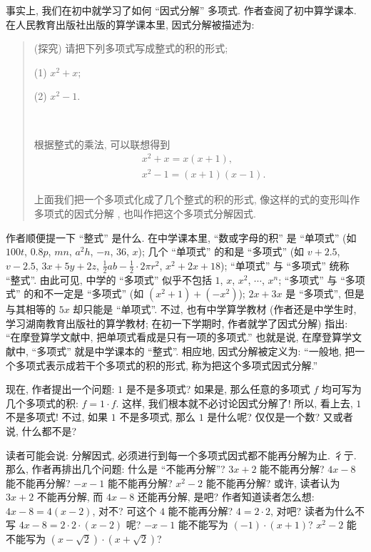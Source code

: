 \begin{example}
    事实上, 我们在初中就学习了如何 ``因式分解'' 多项式. 作者查阅了初中算学课本. 在人民教育出版社出版的算学课本里, 因式分解被描述为:
    \begin{quotation}
        (探究) 请把下列多项式写成整式的积的形式;

        (1) $x^2 + x$;

        (2) $x^2 - 1$.

        ~\

        根据整式的乘法, 可以联想得到
        \begin{align*}
             & x^2 + x = x(x+1),         \\
             & x^2 - 1 = (x + 1)(x - 1).
        \end{align*}

        上面我们把一个多项式化成了几个整式的积的形式, 像这样的式的变形叫作多项式的因式分解 , 也叫作把这个多项式分解因式.
    \end{quotation}

    作者顺便提一下 ``整式'' 是什么. 在中学课本里, ``数或字母的积'' 是 ``单项式'' (如 $100t$, $0.8p$, $mn$, $a^2 h$, $-n$, $36$, $x$); 几个 ``单项式'' 的和是 ``多项式'' (如 $v + 2.5$, $v - 2.5$, $3x + 5y + 2z$, $\frac{1}{2}ab - \frac{1}{2} \cdot 2\pi r^2$, $x^2 + 2x + 18$); ``单项式'' 与 ``多项式'' 统称 ``整式''. 由此可见, 中学的 ``多项式'' 似乎不包括 $1$, $x$, $x^2$, $\cdots$, $x^n$; ``多项式'' 与 ``多项式'' 的和不一定是 ``多项式'' (如 $(x^2 + 1) + (-x^2)$); $2x + 3x$ 是 ``多项式'', 但是与其相等的 $5x$ 却只能是 ``单项式''. 不过, 也有中学算学教材 (作者还是中学生时, 学习湖南教育出版社的算学教材; 在初一下学期时, 作者就学了因式分解) 指出: ``在摩登算学文献中, 把单项式看成是只有一项的多项式.'' 也就是说, 在摩登算学文献中, ``多项式'' 就是中学课本的 ``整式''. 相应地, 因式分解被定义为: ``一般地, 把一个多项式表示成若干个多项式的积的形式, 称为把这个多项式因式分解.''

    现在, 作者提出一个问题: $1$ 是不是多项式? 如果是, 那么任意的多项式 $f$ 均可写为几个多项式的积: $f = 1 \cdot f$. 这样, 我们根本就不必讨论因式分解了! 所以, 看上去, $1$ 不是多项式! 不过, 如果 $1$ 不是多项式, 那么 $1$ 是什么呢? 仅仅是一个数? 又或者说, 什么都不是?

    读者可能会说: 分解因式, 必须进行到每一个多项式因式都不能再分解为止. 彳亍. 那么, 作者再排出几个问题: 什么是 ``不能再分解''? $3x + 2$ 能不能再分解? $4x - 8$ 能不能再分解? $-x - 1$ 能不能再分解? $x^2 - 2$ 能不能再分解? 或许, 读者认为 $3x + 2$ 不能再分解, 而 $4x - 8$ 还能再分解, 是吧? 作者知道读者怎么想: $4x - 8 = 4(x - 2)$, 对不? 可这个 $4$ 能不能再分解? $4 = 2 \cdot 2$, 对吧? 读者为什么不写 $4x - 8 = 2 \cdot 2 \cdot (x-2)$ 呢? $-x - 1$ 能不能写为 $(-1) \cdot (x+1)$? $x^2 - 2$ 能不能写为 $(x - \sqrt{2}) \cdot (x + \sqrt{2})$?


\end{example}
